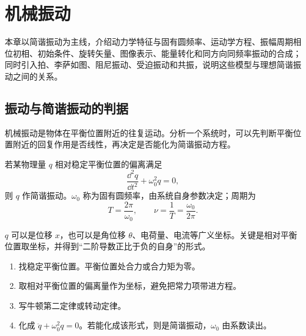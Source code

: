 %
%

\chapter{机械振动}

\begin{summary}[本章内容概览]
本章以简谐振动为主线，介绍动力学特征与固有圆频率、运动学方程、振幅周期相位初相、初始条件、旋转矢量、图像表示、能量转化和同方向同频率振动的合成；同时引入拍、李萨如图、阻尼振动、受迫振动和共振，说明这些模型与理想简谐振动之间的关系。
\end{summary}

\section{振动与简谐振动的判据}

机械振动是物体在平衡位置附近的往复运动。分析一个系统时，可以先判断平衡位置附近的回复作用是否线性，再决定是否能化为简谐振动方程。

\begin{definition}[简谐振动的动力学判据]\label{def:shm-dynamic-criterion}
若某物理量 $q$ 相对稳定平衡位置的偏离满足
\[
  \frac{\dd^2 q}{\dd t^2}+\omega_0^2 q=0,
\]
则 $q$ 作简谐振动。$\omega_0$ 称为固有圆频率，由系统自身参数决定；周期为
\[
  T=\frac{2\pi}{\omega_0},\qquad \nu=\frac1T=\frac{\omega_0}{2\pi}.
\]
\end{definition}

\begin{attention}
$q$ 可以是位移 $x$，也可以是角位移 $\theta$、电荷量、电流等广义坐标。关键是相对平衡位置取坐标，并得到“二阶导数正比于负的自身”的形式。
\end{attention}

\begin{method}[判断一个系统是否为简谐振动]
\begin{enumerate}
  \item 找稳定平衡位置。平衡位置处合力或合力矩为零。
  \item 取相对平衡位置的偏离量作为坐标，避免把常力项带进方程。
  \item 写牛顿第二定律或转动定律。
  \item 化成 $\ddot q+\omega_0^2q=0$。若能化成该形式，则是简谐振动，$\omega_0$ 由系数读出。
\end{enumerate}
\end{method}

